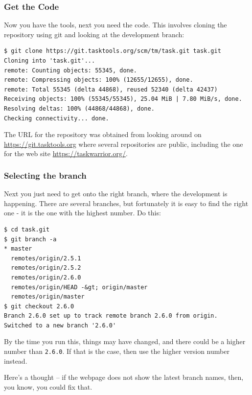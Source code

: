 \documentclass[t,handout]{beamer}
\begin{document}
\begin{frame}[fragile]\frametitle{Get the Code}
    Now you have the tools, next you need the code. This involves cloning the repository using git and looking at the development branch:
    \begin{lstlisting}
$ git clone https://git.tasktools.org/scm/tm/task.git task.git
Cloning into 'task.git'...
remote: Counting objects: 55345, done.
remote: Compressing objects: 100% (12655/12655), done.
remote: Total 55345 (delta 44868), reused 52340 (delta 42437)
Receiving objects: 100% (55345/55345), 25.04 MiB | 7.80 MiB/s, done.
Resolving deltas: 100% (44868/44868), done.
Checking connectivity... done.\end{lstlisting}

    The URL for the repository was obtained from looking around on \href{https://git.tasktools.org}{https://git.tasktools.org}    where several repositories are public, including the one for the web site \href{https://taskwarrior.org/}{https://taskwarrior.org/}.
\end{frame}

\begin{frame}[fragile]\frametitle{Selecting the branch}
    Next you just need to get onto the right branch, where the development is happening. There are several branches, but fortunately it is easy to find the right one - it is the one with the highest number. Do this:

\begin{lstlisting}
$ cd task.git
$ git branch -a
* master
  remotes/origin/2.5.1
  remotes/origin/2.5.2
  remotes/origin/2.6.0
  remotes/origin/HEAD -&gt; origin/master
  remotes/origin/master
$ git checkout 2.6.0
Branch 2.6.0 set up to track remote branch 2.6.0 from origin.
Switched to a new branch '2.6.0'\end{lstlisting}

    By the time you run this, things may have changed, and there could be a higher number than \verb=2.6.0=. If that is the case, then use the higher version number instead.

    Here's a thought -- if the webpage does not show the latest branch names, then, you know, you could fix that.
\end{frame}
\end{document}
